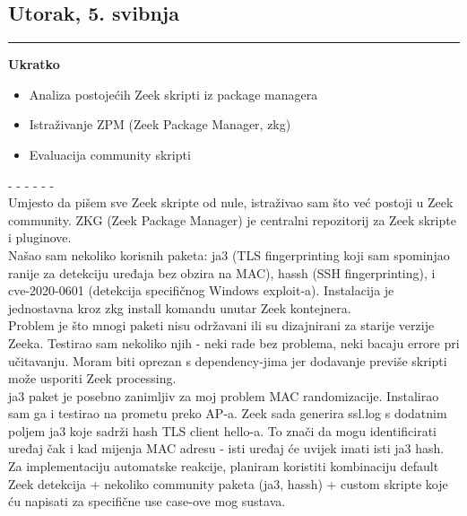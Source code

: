 \documentclass[12pt, a4paper]{article}
\newcommand{\dan}[1]{
    \subsection*{#1}
    \vspace{-0.5em} 
    \hrule \vspace{0.5em} 
}
\begin{document}
\dan{Utorak, 5. svibnja}
\textbf{Ukratko}
\begin{itemize}
    \item Analiza postojećih Zeek skripti iz package managera
    \item Istraživanje ZPM (Zeek Package Manager, zkg)
    \item Evaluacija community skripti
\end{itemize}
- - - - - - \\
Umjesto da pišem sve Zeek skripte od nule, istraživao sam što već postoji u Zeek community. ZKG (Zeek Package Manager) je centralni repozitorij za Zeek skripte i pluginove.
\\
Našao sam nekoliko korisnih paketa: ja3 (TLS fingerprinting koji sam spominjao ranije za detekciju uređaja bez obzira na MAC), hassh (SSH fingerprinting), i cve-2020-0601 (detekcija specifičnog Windows exploit-a). Instalacija je jednostavna kroz zkg install komandu unutar Zeek kontejnera.
\\
Problem je što mnogi paketi nisu održavani ili su dizajnirani za starije verzije Zeeka. Testirao sam nekoliko njih - neki rade bez problema, neki bacaju errore pri učitavanju. Moram biti oprezan s dependency-jima jer dodavanje previše skripti može usporiti Zeek processing.
\\
ja3 paket je posebno zanimljiv za moj problem MAC randomizacije. Instalirao sam ga i testirao na prometu preko AP-a. Zeek sada generira ssl.log s dodatnim poljem ja3 koje sadrži hash TLS client hello-a. To znači da mogu identificirati uređaj čak i kad mijenja MAC adresu - isti uređaj će uvijek imati isti ja3 hash.
\\
Za implementaciju automatske reakcije, planiram koristiti kombinaciju default Zeek detekcija + nekoliko community paketa (ja3, hassh) + custom skripte koje ću napisati za specifične use case-ove mog sustava.
\end{document}
